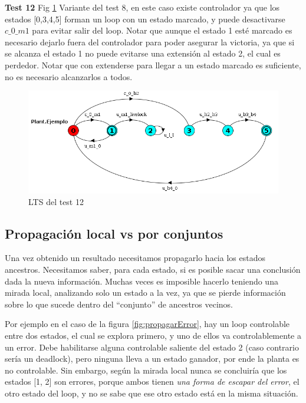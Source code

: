 \FloatBarrier
\textbf{Test 12} Fig \ref{fig:test12}
Variante del test 8, en este caso existe controlador ya que los estados [0,3,4,5] forman un loop con un estado marcado, y puede desactivarse $c\_0\_m1$ para evitar salir del loop. Notar que aunque el estado 1 esté marcado es necesario dejarlo fuera del controlador para poder asegurar la victoria, ya que si se alcanza el estado 1 no puede evitarse una extensión al estado 2, el cual es perdedor. Notar que con extenderse para llegar a un estado marcado es suficiente, no es necesario alcanzarlos a todos.
\begin{figure}[h]
 \centering
 \includegraphics[scale=0.6]{figures/tests/test12.png}
 \caption{LTS del test 12}
 \label{fig:test12}
\end{figure}

\FloatBarrier
\subsection{Propagación local vs por conjuntos}\label{propagacionLocal}

Una vez obtenido un resultado necesitamos propagarlo hacia los estados ancestros. Necesitamos saber, para cada estado, si es posible sacar una conclusión dada la nueva información. Muchas veces es imposible hacerlo teniendo una mirada local, analizando solo un estado a la vez, ya que se pierde información sobre lo que sucede dentro del ``conjunto'' de ancestros vecinos.

Por ejemplo en el caso de la figura \ref{fig:propagarError}, hay un loop controlable entre dos estados, el cual se explora primero, y uno de ellos va controlablemente a un error. Debe habilitarse alguna controlable saliente del estado 2 (caso contrario sería un deadlock), pero ninguna lleva a un estado ganador, por ende la planta es no controlable. Sin embargo, según la mirada local nunca se concluiría que los estados [1, 2] son errores, porque ambos tienen \textit{una forma de escapar del error}, el otro estado del loop, y no se sabe que ese otro estado está en la misma situación. 

